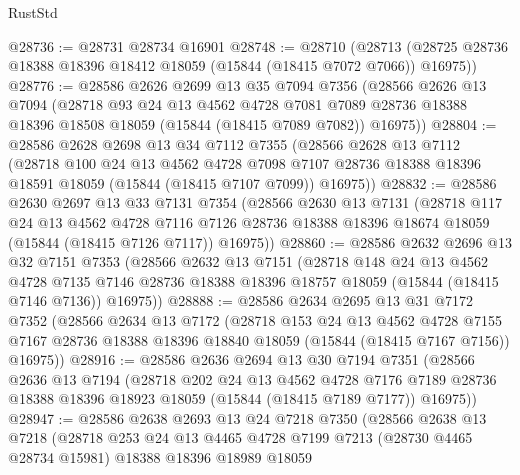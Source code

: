 \begin{lexlean}{RustStd}
\begin{coremodule}
@28736 := @28731 @28734 @16901
@28748 := @28710
    (@28713 (@28725 @28736 @18388 @18396 @18412 @18059 (@15844 (@18415 @7072 @7066)) @16975))
@28776 := @28586
    @2626
    @2699
    @13
    @35
    @7094
    @7356
    (@28566
      @2626
      @13
      @7094
      (@28718
        @93
        @24
        @13
        @4562
        @4728
        @7081
        @7089
        @28736
        @18388
        @18396
        @18508
        @18059
        (@15844 (@18415 @7089 @7082))
        @16975))
@28804 := @28586
    @2628
    @2698
    @13
    @34
    @7112
    @7355
    (@28566
      @2628
      @13
      @7112
      (@28718
        @100
        @24
        @13
        @4562
        @4728
        @7098
        @7107
        @28736
        @18388
        @18396
        @18591
        @18059
        (@15844 (@18415 @7107 @7099))
        @16975))
@28832 := @28586
    @2630
    @2697
    @13
    @33
    @7131
    @7354
    (@28566
      @2630
      @13
      @7131
      (@28718
        @117
        @24
        @13
        @4562
        @4728
        @7116
        @7126
        @28736
        @18388
        @18396
        @18674
        @18059
        (@15844 (@18415 @7126 @7117))
        @16975))
@28860 := @28586
    @2632
    @2696
    @13
    @32
    @7151
    @7353
    (@28566
      @2632
      @13
      @7151
      (@28718
        @148
        @24
        @13
        @4562
        @4728
        @7135
        @7146
        @28736
        @18388
        @18396
        @18757
        @18059
        (@15844 (@18415 @7146 @7136))
        @16975))
@28888 := @28586
    @2634
    @2695
    @13
    @31
    @7172
    @7352
    (@28566
      @2634
      @13
      @7172
      (@28718
        @153
        @24
        @13
        @4562
        @4728
        @7155
        @7167
        @28736
        @18388
        @18396
        @18840
        @18059
        (@15844 (@18415 @7167 @7156))
        @16975))
@28916 := @28586
    @2636
    @2694
    @13
    @30
    @7194
    @7351
    (@28566
      @2636
      @13
      @7194
      (@28718
        @202
        @24
        @13
        @4562
        @4728
        @7176
        @7189
        @28736
        @18388
        @18396
        @18923
        @18059
        (@15844 (@18415 @7189 @7177))
        @16975))
@28947 := @28586
    @2638
    @2693
    @13
    @24
    @7218
    @7350
    (@28566
      @2638
      @13
      @7218
      (@28718
        @253
        @24
        @13
        @4465
        @4728
        @7199
        @7213
        (@28730 @4465 @28734 @15981)
        @18388
        @18396
        @18989
        @18059

\end{coremodule}
\end{lexlean}
